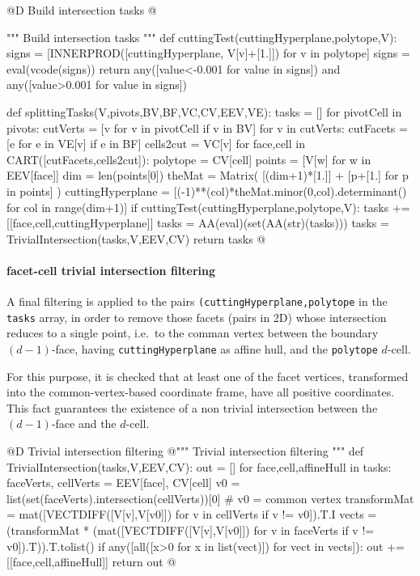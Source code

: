 \documentclass[11pt,oneside]{article}	%
\begin{document}
@D Build intersection tasks
@{""" Build intersection tasks """
def cuttingTest(cuttingHyperplane,polytope,V):
	signs = [INNERPROD([cuttingHyperplane, V[v]+[1.]]) for v in polytope]
	signs = eval(vcode(signs))
	return any([value<-0.001 for value in signs]) and any([value>0.001 for value in signs])

def splittingTasks(V,pivots,BV,BF,VC,CV,EEV,VE):
	tasks = []
	for pivotCell in pivots:
		cutVerts = [v for v in pivotCell if v in BV]
		for v in cutVerts:
			cutFacets = [e for e in VE[v] if e in BF]
			cells2cut = VC[v]
			for face,cell in CART([cutFacets,cells2cut]):
				polytope = CV[cell]
				points = [V[w] for w in EEV[face]]
				dim = len(points[0])
				theMat = Matrix( [(dim+1)*[1.]] + [p+[1.] for p in points] )
				cuttingHyperplane = [(-1)**(col)*theMat.minor(0,col).determinant() 
									for col in range(dim+1)]
				if cuttingTest(cuttingHyperplane,polytope,V):
					tasks += [[face,cell,cuttingHyperplane]]
	tasks = AA(eval)(set(AA(str)(tasks)))
	tasks = TrivialIntersection(tasks,V,EEV,CV)
	return tasks
@}

\paragraph{facet-cell trivial intersection filtering}

A final filtering is applied to the pairs \texttt{(cutting\-Hyper\-plane,polytope} in the \texttt{tasks} array, in order to remove those facets (pairs in 2D) whose intersection reduces to a single point, i.e.~to the comman vertex between the boundary $(d-1)$-face, having \texttt{cuttingHyperplane} as affine hull, and the \texttt{polytope} $d$-cell.

For this purpose, it is checked that at least one of the facet vertices, transformed into the common-vertex-based coordinate frame, have all positive coordinates. This fact guarantees the existence of a non trivial intersection between the $(d-1)$-face and the $d$-cell.

@D Trivial intersection filtering
@{""" Trivial intersection filtering """
def TrivialIntersection(tasks,V,EEV,CV):
	out = []
	for face,cell,affineHull in tasks:
		faceVerts, cellVerts = EEV[face], CV[cell]
		v0 = list(set(faceVerts).intersection(cellVerts))[0] # v0 = common vertex
		transformMat = mat([VECTDIFF([V[v],V[v0]]) for v in cellVerts if v != v0]).T.I
		vects = (transformMat * (mat([VECTDIFF([V[v],V[v0]]) for v in faceVerts 
					if v != v0]).T)).T.tolist()
		if any([all([x>0 for x in list(vect)]) for vect in vects]): 
			out += [[face,cell,affineHull]]
	return out
@}
\end{document}
